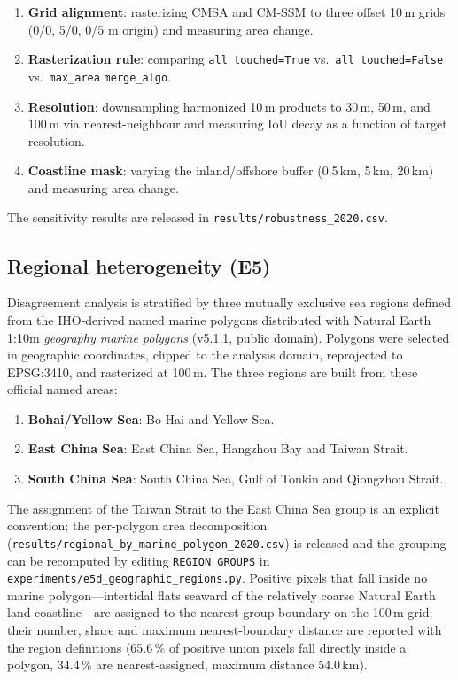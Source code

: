 \documentclass[11pt]{article}
\begin{document}
\begin{enumerate}[nosep]
\item \textbf{Grid alignment}: rasterizing CMSA and CM-SSM to three offset 10\,m
  grids (0/0, 5/0, 0/5 m origin) and measuring area change.
\item \textbf{Rasterization rule}: comparing \texttt{all\_touched=True} vs.\
  \texttt{all\_touched=False} vs.\ \texttt{max\_area} \texttt{merge\_algo}.
\item \textbf{Resolution}: downsampling harmonized 10\,m products to 30\,m,
  50\,m, and 100\,m via nearest-neighbour and measuring IoU decay as a
  function of target resolution.
\item \textbf{Coastline mask}: varying the inland/offshore buffer (0.5\,km,
  5\,km, 20\,km) and measuring area change.
\end{enumerate}

The sensitivity results are released in
\texttt{results/robustness\_2020.csv}.

\subsection{Regional heterogeneity (E5)}
\label{sec:methods-e5}

Disagreement analysis is stratified by three mutually exclusive sea regions
defined from the IHO-derived named marine polygons distributed with Natural
Earth 1:10m \emph{geography marine polygons} (v5.1.1, public domain). Polygons
were selected in geographic coordinates, clipped to the analysis domain,
reprojected to EPSG:3410, and rasterized at 100\,m. The three regions are
built from these official named areas:

\begin{enumerate}[nosep]
\item \textbf{Bohai/Yellow Sea}: Bo Hai and Yellow Sea.
\item \textbf{East China Sea}: East China Sea, Hangzhou Bay and Taiwan Strait.
\item \textbf{South China Sea}: South China Sea, Gulf of Tonkin and Qiongzhou
  Strait.
\end{enumerate}

The assignment of the Taiwan Strait to the East China Sea group is an explicit
convention; the per-polygon area decomposition
(\texttt{results/regional\_by\_marine\_polygon\_2020.csv}) is released and the
grouping can be recomputed by editing \texttt{REGION\_GROUPS} in
\texttt{experiments/e5d\_geographic\_regions.py}. Positive pixels that fall inside no marine polygon---intertidal
flats seaward of the relatively coarse Natural Earth land coastline---are
assigned to the nearest group boundary on the 100\,m grid; their number, share
and maximum nearest-boundary distance are reported with the region
definitions (65.6\,\% of positive union pixels fall directly inside a polygon,
34.4\,\% are nearest-assigned, maximum distance 54.0\,km).
\end{document}
